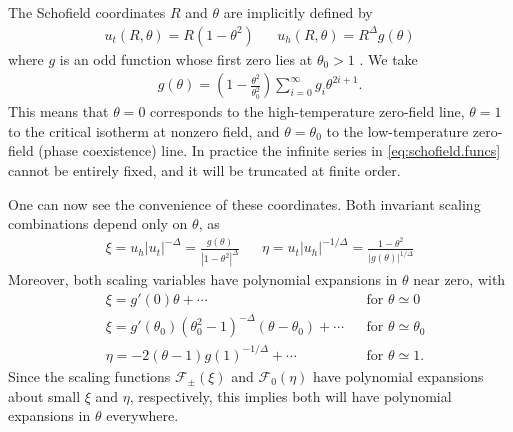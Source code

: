\documentclass[
aps,
pre,
preprint,
longbibliography,
floatfix
]{revtex4-2}
\begin{document}
The Schofield coordinates $R$ and $\theta$ are implicitly defined by
\begin{align} \label{eq:schofield}
  u_t(R, \theta) = R(1-\theta^2)
  &&
  u_h(R, \theta) = R^{\Delta}g(\theta)
\end{align}
where $g$ is an odd function whose first zero lies at $\theta_0>1$
\cite{Schofield_1969_Parametric}. We take
\begin{align} \label{eq:schofield.funcs}
  g(\theta)=\left(1-\frac{\theta^2}{\theta_0^2}\right)\sum_{i=0}^\infty g_i\theta^{2i+1}.
\end{align}
This means that $\theta=0$ corresponds to the high-temperature zero-field line,
$\theta=1$ to the critical isotherm at nonzero field, and $\theta=\theta_0$ to
the low-temperature zero-field (phase coexistence) line.
In practice the infinite series in \eqref{eq:schofield.funcs} cannot be
entirely fixed, and it will be truncated at finite order.

One can now see the convenience of these coordinates. Both invariant scaling
combinations depend only on $\theta$, as
\begin{align}
  \xi=u_h|u_t|^{-\Delta}=\frac{g(\theta)}{|1-\theta^2|^{\Delta}} &&
  \eta=u_t|u_h|^{-1/\Delta}=\frac{1-\theta^2}{|g(\theta)|^{1/\Delta}}
\end{align}
Moreover, both scaling variables have polynomial expansions in $\theta$ near
zero, with
\begin{align}
  &\xi= g'(0)\theta+\cdots  && \text{for $\theta\simeq0$}\\
  &\xi=g'(\theta_0)(\theta_0^2-1)^{-\Delta}(\theta-\theta_0)+\cdots && \text{for $\theta\simeq\theta_0$}
  \\
  &\eta=-2(\theta-1)g(1)^{-1/\Delta}+\cdots && \text{for $\theta\simeq1$}.
\end{align}
Since the scaling functions $\mathcal F_\pm(\xi)$ and $\mathcal F_0(\eta)$ have
polynomial expansions about small $\xi$ and $\eta$, respectively, this implies
both will have polynomial expansions in $\theta$ everywhere.
\end{document}
